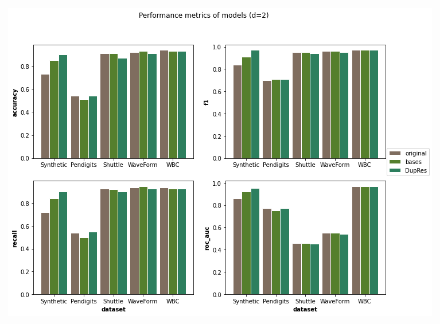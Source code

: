 \begin{figure}
  \centering
  \includegraphics[width=\linewidth]{images/performance_metrics.png}
  \caption{}
  \label{fig:performance_metrics}
\end{figure}



